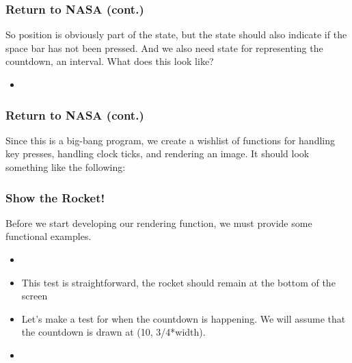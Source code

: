 \documentclass{beamer}
\begin{document}

\begin{frame}
  \frametitle{Return to NASA (cont.)}
  So position is obviously part of the state, but the state
  should also indicate if the space bar has not been pressed. And we also
  need state for representing the countdown, an interval. What does this look like?
  \begin{itemize}
  \item<2-> \LRCD
  \end{itemize}  
\end{frame}

\begin{frame}
  \frametitle{Return to NASA (cont.)}
  Since this is a big-bang program, we create a wishlist of functions for
  handling key presses, handling clock ticks, and rendering an image. It should
  look something like the following:
  \pause
 \rocketWish    
\end{frame}



\begin{frame}
  \frametitle{Show the Rocket!}
  Before we start developing our rendering function, we must provide some
  functional examples.
  \begin{itemize}
  \item<2-> \showTestOne
  \item<3-> This test is straightforward, the rocket should remain at the
    bottom of the screen
  \item<4-> Let's make a test for when the countdown is happening. We will
    assume that the countdown is drawn at (10, 3/4*width).
  \item<5-> \showTestTwo
  \end{itemize}
\end{frame}
\end{document}
